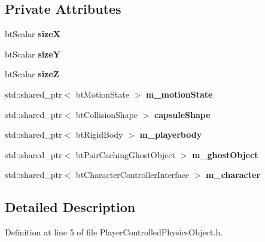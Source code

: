 \subsection*{Private Attributes}
\begin{DoxyCompactItemize}
\item 
bt\+Scalar {\bfseries sizeX}\hypertarget{class_physics_1_1_player_controlled_physics_object_a04f4857a183822a50607da03850ab7d1}{}\label{class_physics_1_1_player_controlled_physics_object_a04f4857a183822a50607da03850ab7d1}

\item 
bt\+Scalar {\bfseries sizeY}\hypertarget{class_physics_1_1_player_controlled_physics_object_a2e45c7c6cf7094a3cd2e84897d406058}{}\label{class_physics_1_1_player_controlled_physics_object_a2e45c7c6cf7094a3cd2e84897d406058}

\item 
bt\+Scalar {\bfseries sizeZ}\hypertarget{class_physics_1_1_player_controlled_physics_object_a203c49b83634cd70975c5696b0f2279e}{}\label{class_physics_1_1_player_controlled_physics_object_a203c49b83634cd70975c5696b0f2279e}

\item 
std\+::shared\+\_\+ptr$<$ bt\+Motion\+State $>$ {\bfseries m\+\_\+motion\+State}\hypertarget{class_physics_1_1_player_controlled_physics_object_a67983f19ba82f4a8c7e399da26605ed2}{}\label{class_physics_1_1_player_controlled_physics_object_a67983f19ba82f4a8c7e399da26605ed2}

\item 
std\+::shared\+\_\+ptr$<$ bt\+Collision\+Shape $>$ {\bfseries capsule\+Shape}\hypertarget{class_physics_1_1_player_controlled_physics_object_a2425caf22893455876fd6695bde2c0ef}{}\label{class_physics_1_1_player_controlled_physics_object_a2425caf22893455876fd6695bde2c0ef}

\item 
std\+::shared\+\_\+ptr$<$ bt\+Rigid\+Body $>$ {\bfseries m\+\_\+playerbody}\hypertarget{class_physics_1_1_player_controlled_physics_object_a62480810f2ad6acc193d9b1b6c24adc3}{}\label{class_physics_1_1_player_controlled_physics_object_a62480810f2ad6acc193d9b1b6c24adc3}

\item 
std\+::shared\+\_\+ptr$<$ bt\+Pair\+Caching\+Ghost\+Object $>$ {\bfseries m\+\_\+ghost\+Object}\hypertarget{class_physics_1_1_player_controlled_physics_object_a8b8fb9132bf7f351dc36d66fb817926b}{}\label{class_physics_1_1_player_controlled_physics_object_a8b8fb9132bf7f351dc36d66fb817926b}

\item 
std\+::shared\+\_\+ptr$<$ bt\+Character\+Controller\+Interface $>$ {\bfseries m\+\_\+character}\hypertarget{class_physics_1_1_player_controlled_physics_object_a726afd495c368b8d6bdff34fa7073bf8}{}\label{class_physics_1_1_player_controlled_physics_object_a726afd495c368b8d6bdff34fa7073bf8}

\end{DoxyCompactItemize}


\subsection{Detailed Description}


Definition at line 5 of file Player\+Controlled\+Physics\+Object.\+h.

